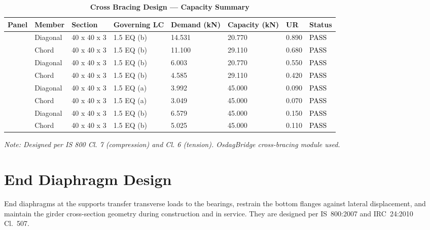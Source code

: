 \documentclass[12pt,a4paper]{report}
\numberwithin{table}{chapter}
\numberwithin{figure}{chapter}
\begin{document}
\vspace{1em}
\begin{longtable}{|C{2.0cm}|L{1.8cm}|C{2.2cm}|C{3.0cm}|C{1.8cm}|C{1.8cm}|C{1.2cm}|C{1.8cm}|}
\caption{\textbf{Cross Bracing Design --- Capacity Summary}}
\hline
\textbf{Panel} & \textbf{Member} & \textbf{Section} & \textbf{Governing LC} & \textbf{Demand (kN)} & \textbf{Capacity (kN)} & \textbf{UR} & \textbf{Status} \\[6pt]
\hline
{} & Diagonal & 40 x 40 x 3 & 1.5 EQ (b) & 14.531 & 20.770 & 0.890 & \textcolor{black}{PASS} \\[6pt]
 & Chord & 40 x 40 x 3 & 1.5 EQ (b) & 11.100 & 29.110 & 0.680 & \textcolor{black}{PASS} \\[6pt]
\hline
{} & Diagonal & 40 x 40 x 3 & 1.5 EQ (b) & 6.003 & 20.770 & 0.550 & \textcolor{black}{PASS} \\[6pt]
 & Chord & 40 x 40 x 3 & 1.5 EQ (b) & 4.585 & 29.110 & 0.420 & \textcolor{black}{PASS} \\[6pt]
\hline
{} & Diagonal & 40 x 40 x 3 & 1.5 EQ (a) & 3.992 & 45.000 & 0.090 & \textcolor{black}{PASS} \\[6pt]
 & Chord & 40 x 40 x 3 & 1.5 EQ (a) & 3.049 & 45.000 & 0.070 & \textcolor{black}{PASS} \\[6pt]
\hline
{} & Diagonal & 40 x 40 x 3 & 1.5 EQ (b) & 6.579 & 45.000 & 0.150 & \textcolor{black}{PASS} \\[6pt]
 & Chord & 40 x 40 x 3 & 1.5 EQ (b) & 5.025 & 45.000 & 0.110 & \textcolor{black}{PASS} \\[6pt]
\hline
\end{longtable}
\noindent\textit{Note: Designed per IS 800 Cl. 7 (compression) and Cl. 6 (tension). OsdagBridge cross-bracing module used.}

\section{End Diaphragm Design}
\label{sec:end-diaphragm}

End diaphragms at the supports transfer transverse loads to the bearings, restrain the bottom flanges against lateral displacement, and maintain the girder cross-section geometry during construction and in service. They are designed per IS~800:2007 and IRC~24:2010 Cl.~507.
\end{document}
